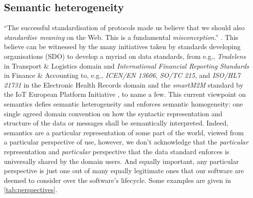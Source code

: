 \documentclass[sort&compress,preprint,authoryear,3p,twocolumn]{elsarticle}
\begin{document}
\hypertarget{semantic-heterogeneity}{%
\subsection{Semantic heterogeneity}\label{semantic-heterogeneity}}

``The successful standardisation of protocols made us believe that we
should also \emph{standardise meaning} on the Web. This is a fundamental
\emph{misconception}.'' \citep{Janowicz:2013ui}. This believe can be
witnessed by the many initiatives taken by standards developing
organisations (SDO) to develop a myriad on data standards, from e.g.,
\emph{Tradelens} in Transport \& Logistics domain and
\emph{International Financial Reporting Standards} in Finance \&
Accounting to, e.g., \emph{ICEN/EN 13606}, \emph{SO/TC 215}, and
\emph{ISO/HL7 21731} in the Electronic Health Records domain and the
\emph{smartM2M} standard by the IoT European Platform Initiative
\citep{ETSI2019}, to name a few. This current viewpoint on semantics
defies semantic heterogeneity and enforces semantic homogeneity: one
single agreed domain convention on how the syntactic representation and
structure of the data or messages shall be semantically interpreted.
Indeed, semantics are a particular representation of some part of the
world, viewed from a particular perspective of use, however, we don't
acknowledge that the \emph{particular} representation and
\emph{particular} perspective that the data standard enforces is
universally shared by the domain users. And equally important, any
particular perspective is just one out of many equally legitimate ones
that our software are deemed to consider over the software's lifecycle.
Some examples are given in \cref{tab:perspectives}.
\end{document}
